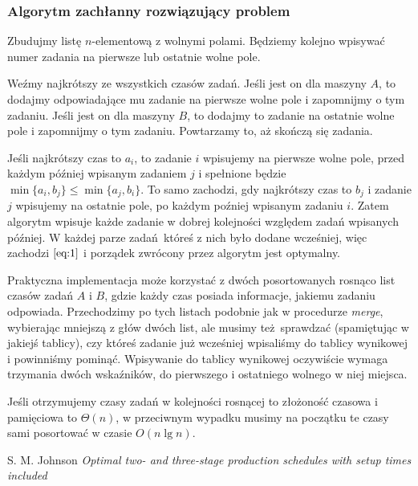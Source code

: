 \documentclass[a4paper, 12pt]{article}
\newcommand{\+}{\enspace}
\begin{document}
\subsubsection*{Algorytm zachłanny rozwiązujący problem}
Zbudujmy listę $n$-elementową z wolnymi polami.
Będziemy kolejno wpisywać numer zadania na pierwsze lub ostatnie wolne pole.

Weźmy najkrótszy ze wszystkich czasów zadań.
Jeśli jest on dla maszyny $A$,
to dodajmy odpowiadające mu zadanie na pierwsze wolne pole i zapomnijmy o tym
zadaniu.
Jeśli jest on dla maszyny $B$,
to dodajmy to zadanie na ostatnie wolne pole i zapomnijmy o tym zadaniu.
Powtarzamy to, aż skończą się zadania.

Jeśli najkrótszy czas to $a_i$, to zadanie $i$ wpisujemy na pierwsze wolne
pole, przed każdym później wpisanym zadaniem $j$ i spełnione będzie
$\min \{a_i, b_j \} ≤ \min \{ a_j, b_i \}$.
To samo zachodzi, gdy najkrótszy czas to
$b_j$ i zadanie $j$ wpisujemy na ostatnie pole,
po każdym poźniej wpisanym zadaniu $i$.
Zatem algorytm wpisuje każde
zadanie w dobrej kolejności względem zadań wpisanych później.  W każdej parze
zadań któreś z nich było dodane wcześniej, więc zachodzi $\eqref{eq:1}$ i
porządek zwrócony przez algorytm jest optymalny.

Praktyczna implementacja może korzystać z dwóch posortowanych rosnąco list
czasów zadań $A$ i $B$, gdzie każdy czas posiada informacje, jakiemu zadaniu
odpowiada.  Przechodzimy po tych listach podobnie jak w procedurze
\textit{merge}, wybierając mniejszą z głów dwóch list, ale musimy też sprawdzać
(spamiętując w jakiejś tablicy), czy któreś zadanie już wcześniej wpisaliśmy do
tablicy wynikowej i powinniśmy pominąć.  Wpisywanie do tablicy wynikowej
oczywiście wymaga trzymania dwóch wskaźników, do pierwszego i ostatniego
wolnego w niej miejsca.

Jeśli otrzymujemy czasy zadań w kolejności rosnącej to złożoność czasowa
i pamięciowa to $Θ(n)$, w przeciwnym wypadku musimy na początku te czasy sami
posortować w
czasie $O(n \lg n)$.

\begin{thebibliography}{1}
	S. M. Johnson
		\textit{Optimal two- and three-stage production schedules with setup times included}
\end{thebibliography}


\iffalse
\section*{2/8}
Zestaw monet, dla których zachłanne wydawanie reszty jest optymalne,
nazywamy kanonicznym.
Zakładamy, że zestawy monet są podawane w kolejności rosnącej.

Wystarczy sprawdzić, czy algorythm zachłanny jest poprawny dla kwot
$b$ i $\lceil \frac{c}{b} \rceil b$.

Zestaw $M=(1, a, b)$ jest kanoniczny $⇔$ $0 < r <a-q$, gdzie $b = qa + r$, $0 < r < b$.
\fi
\end{document}
